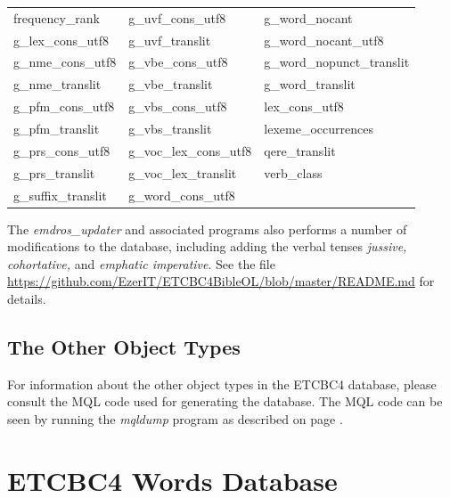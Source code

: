 \documentclass[11pt,oneside,a4paper]{memoir}
\begin{document}
\begin{center}
  \begin{tabular}{lll}
    frequency\_rank     & g\_uvf\_cons\_utf8      & g\_word\_nocant            \\
    g\_lex\_cons\_utf8  & g\_uvf\_translit        & g\_word\_nocant\_utf8      \\
    g\_nme\_cons\_utf8  & g\_vbe\_cons\_utf8      & g\_word\_nopunct\_translit \\
    g\_nme\_translit    & g\_vbe\_translit        & g\_word\_translit          \\
    g\_pfm\_cons\_utf8  & g\_vbs\_cons\_utf8      & lex\_cons\_utf8            \\
    g\_pfm\_translit    & g\_vbs\_translit        & lexeme\_occurrences        \\
    g\_prs\_cons\_utf8  & g\_voc\_lex\_cons\_utf8 & qere\_translit             \\
    g\_prs\_translit    & g\_voc\_lex\_translit   & verb\_class                \\
    g\_suffix\_translit & g\_word\_cons\_utf8     &                            \\
  \end{tabular}
\end{center}

The \emph{emdros\_updater} and associated programs also performs a number of modifications to the
database, including adding the verbal tenses \emph{jussive, cohortative,} and \emph{emphatic
  imperative}. See the file \url{https://github.com/EzerIT/ETCBC4BibleOL/blob/master/README.md} for
details.

\section{The Other Object Types}

For information about the other object types in the ETCBC4 database, please consult the MQL code
used for generating the database. The MQL code can be seen by running the
\emph{mqldump} program as described on page \pageref{list-mqldump}.

\chapter{ETCBC4 Words Database}\label{app-worddb}
\end{document}
